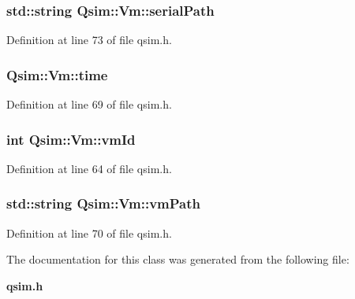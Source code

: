 \subsubsection[{serialPath}]{\setlength{\rightskip}{0pt plus 5cm}std::string {\bf Qsim::Vm::serialPath}\hspace{0.3cm}{\tt  [private]}}\label{classQsim_1_1Vm_7cd2749c225843939510145fec0ee769}




Definition at line 73 of file qsim.h.
\subsubsection[{time}]{ {\bf Qsim::Vm::time}\hspace{0.3cm}{\tt  [private]}}\label{classQsim_1_1Vm_47fc609a45efde553d90de1f6bbbcce5}




Definition at line 69 of file qsim.h.
\subsubsection[{vmId}]{\setlength{\rightskip}{0pt plus 5cm}int {\bf Qsim::Vm::vmId}\hspace{0.3cm}{\tt  [private]}}\label{classQsim_1_1Vm_1486700a7b05a6a82deeda71dcc01f49}




Definition at line 64 of file qsim.h.
\subsubsection[{vmPath}]{\setlength{\rightskip}{0pt plus 5cm}std::string {\bf Qsim::Vm::vmPath}\hspace{0.3cm}{\tt  [private]}}\label{classQsim_1_1Vm_c7bf993b84703bb2a2df16cfd378a60f}




Definition at line 70 of file qsim.h.

The documentation for this class was generated from the following file:\begin{CompactItemize}
\item 
{\bf qsim.h}\end{CompactItemize}
